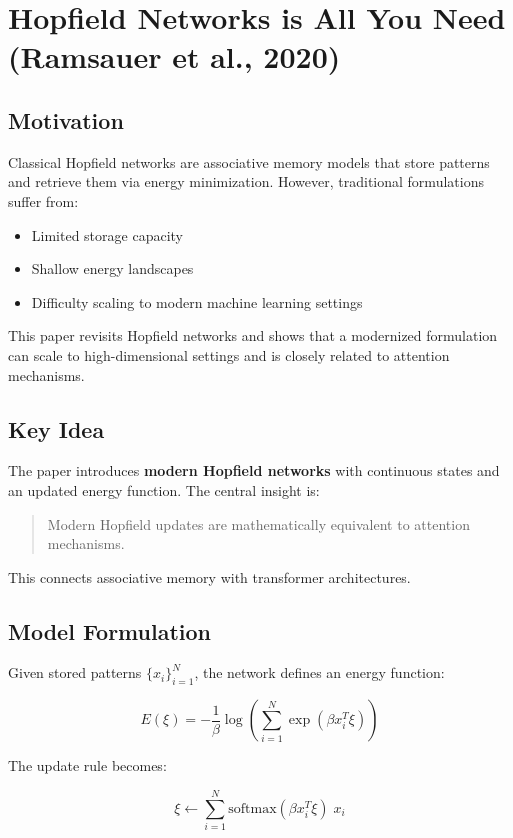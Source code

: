 \documentclass[12pt]{article}
\begin{document}
\psetheader %
\section{Hopfield Networks is All You Need (Ramsauer et al., 2020)}

\subsection{Motivation}

Classical Hopfield networks are associative memory models that store patterns and retrieve them via energy
minimization. However, traditional formulations suffer from:
\begin{itemize}
		\item Limited storage capacity
		\item Shallow energy landscapes
		\item Difficulty scaling to modern machine learning settings
\end{itemize}

This paper revisits Hopfield networks and shows that a modernized formulation can scale to high-dimensional
settings and is closely related to attention mechanisms.

\subsection{Key Idea}

The paper introduces \textbf{modern Hopfield networks} with continuous states and an updated energy function.
The central insight is:

\begin{quote}
		Modern Hopfield updates are mathematically equivalent to attention mechanisms.
\end{quote}

This connects associative memory with transformer architectures.

\subsection{Model Formulation}

Given stored patterns $\{x_i\}_{i=1}^N$, the network defines an energy function:

\[
		E(\xi) = -\frac{1}{\beta} \log \left( \sum_{i=1}^N \exp(\beta x_i^T \xi) \right)
\]

The update rule becomes:

\[
		\xi \leftarrow \sum_{i=1}^N \text{softmax}(\beta x_i^T \xi) \; x_i
\]
\end{document}
